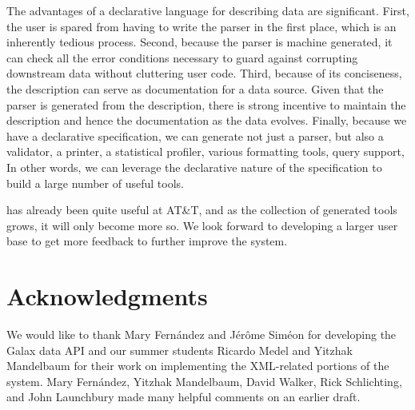 \documentclass{sig-alternate}
\begin{document}
The 
advantages of a declarative language for describing data are
significant.  First, the user is spared from having to write
the parser in the first place, which is an inherently tedious
process.   Second, because the parser is machine
generated, it can check all the error conditions necessary to
guard against corrupting downstream data without cluttering
user code.  Third, because of its conciseness, the \pads{}
description can serve as documentation for a data source.  Given
that the parser is generated from the description, there is 
strong incentive to maintain the description and hence the documentation
as the data evolves.  Finally, because we have a declarative
specification, we can generate not just a parser, but also
a validator, a printer, a statistical profiler, various formatting
tools, query support, \etc{}  In other words, we can leverage the declarative nature of the specification to build a large number of useful tools.

\pads{} has already been quite useful at AT\&T, and as the collection of generated tools grows, it will only become more so.  We look forward to developing a larger user base to get more feedback to further improve the system. 


\section{Acknowledgments}
We would like to thank Mary Fern\'andez and J\'er\^ome Sim\'eon for 
developing the Galax data API and our summer
students Ricardo Medel and Yitzhak Mandelbaum for their work on implementing
the XML-related portions of the \pads{} system.
Mary Fern\'andez, Yitzhak Mandelbaum, David Walker, Rick Schlichting,
and John Launchbury made many helpful comments on an earlier draft.



\small
 
\end{document}
